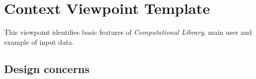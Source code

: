 \chapter{Context Viewpoint Template} \label{chp:context-viewpoint-template}

	This viewpoint identifies basic features of \emph{Computational Library}, main user and example of input data.
	\section{Design concerns} \label{s:context-viewpoint-template:design-concerns}

		
